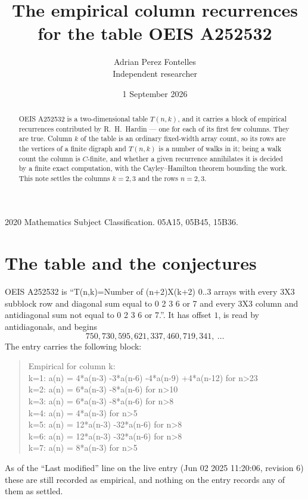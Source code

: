 \documentclass[11pt,a4paper]{article}
\title{The empirical column recurrences for the table OEIS A252532}
\author{Adrian Perez Fontelles\\ \small Independent researcher}
\date{1 September 2026}
\theoremstyle{plain}
\theoremstyle{definition}
\begin{document}
\maketitle

\begin{abstract}
OEIS A252532 is a two-dimensional table $T(n,k)$, and it carries a block of empirical
recurrences contributed by R.~H.~Hardin --- one for each of its first few columns. They are
true. Column $k$ of the table is an ordinary fixed-width array count, so its rows are the
vertices of a finite digraph and $T(n,k)$ is a number of walks in it; being a walk count the
column is $C$-finite, and whether a given recurrence annihilates it is decided by a finite
exact computation, with the Cayley--Hamilton theorem bounding the work. This note settles the columns $k=2, 3$ and the rows $n=2, 3$.
\end{abstract}

\noindent\small 2020 Mathematics Subject Classification. 05A15, 05B45, 15B36.\normalsize

\section{The table and the conjectures}

OEIS A252532 is ``T(n,k)=Number of (n+2)X(k+2) 0..3 arrays with every 3X3 subblock row and diagonal sum equal to 0 2 3 6 or 7 and every 3X3 column and antidiagonal sum not equal to 0 2 3 6 or 7.''. It has offset $1$, is
read by antidiagonals, and begins
\[
750, 730, 595, 621, 337, 460, 719, 341,\ \dots
\]
The entry carries the following block:
\begin{quote}\small
Empirical for column k:\\
k=1: a(n) = 4*a(n-3) -3*a(n-6) -4*a(n-9) +4*a(n-12) for n>23\\
k=2: a(n) = 6*a(n-3) -8*a(n-6) for n>10\\
k=3: a(n) = 6*a(n-3) -8*a(n-6) for n>8\\
k=4: a(n) = 4*a(n-3) for n>5\\
k=5: a(n) = 12*a(n-3) -32*a(n-6) for n>8\\
k=6: a(n) = 12*a(n-3) -32*a(n-6) for n>8\\
k=7: a(n) = 8*a(n-3) for n>5\\
\end{quote}
As of the ``Last modified'' line on the live entry (Jun 02 2025 11:20:06, revision 6) these are still
recorded as empirical, and nothing on the entry records any of them as settled.
\end{document}
